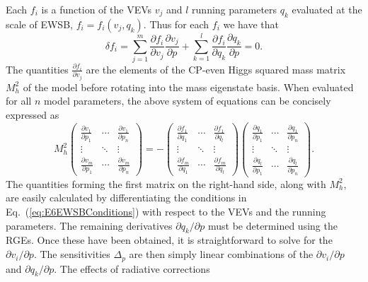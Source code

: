 \documentclass[preprint,amsmath,amssymb,aps,superscriptaddress,prd,showpacs,floatfix,nofootinbib]{revtex4-1}
\begin{document}
Each $f_i$ is a function of the VEVs $v_j$ and $l$ running parameters
$q_k$ evaluated at the scale of EWSB, $f_i=f_i(v_j,q_k)$. Thus for
each $f_i$ we have that
\begin{equation}\label{eq:EWSBchainrule}
\delta f_i = \sum_{j=1}^m \frac{\partial f_i}{\partial
  v_j}\frac{\partial v_j}{\partial p}+\sum_{k=1}^l \frac{\partial
  f_i}{\partial q_k}\frac{\partial q_k}{\partial p}=0.
\end{equation}
The quantities $\frac{\partial f_i}{\partial v_j}$ are the elements of
the CP-even Higgs squared mass matrix $M_h^2$ of the model before
rotating into the mass eigenstate basis. When evaluated for all $n$
model parameters, the above system of equations can be concisely
expressed as
\begin{equation}\label{eq:tuningsystem}
M_h^2\begin{pmatrix}
\frac{\partial v_1}{\partial p_1} & \cdots & \frac{\partial v_1}{\partial p_n} \\
\vdots & \ddots & \vdots \\
\frac{\partial v_m}{\partial p_1} & \cdots & \frac{\partial v_m}{\partial p_n}
\end{pmatrix}=
-\begin{pmatrix}
\frac{\partial f_1}{\partial q_1} & \cdots & \frac{\partial f_1}{\partial q_l} \\
\vdots & \ddots & \vdots \\
\frac{\partial f_m}{\partial q_1} & \cdots & \frac{\partial f_m}{\partial q_l}
\end{pmatrix}
\begin{pmatrix}
\frac{\partial q_1}{\partial p_1} & \cdots & \frac{\partial q_1}{\partial p_n} \\
\vdots & \ddots & \vdots \\
\frac{\partial q_l}{\partial p_1} & \cdots & \frac{\partial q_l}{\partial p_n}
\end{pmatrix}.
\end{equation} 
The quantities forming the first matrix on the right-hand side, along
with $M_h^2$, are easily calculated by differentiating the conditions in Eq.~(\ref{eq:E6EWSBConditions})
with respect to the VEVs and the running parameters. 
The remaining derivatives $\partial q_k /\partial p$ must be determined using the
RGEs. Once these have been obtained, it is straightforward to solve
for the $\partial v_i /\partial p$. The sensitivities 
$\Delta_p$ are then simply linear combinations of the $\partial
v_i/\partial p$ and $\partial q_k/\partial p$. The effects of radiative corrections
\end{document}
